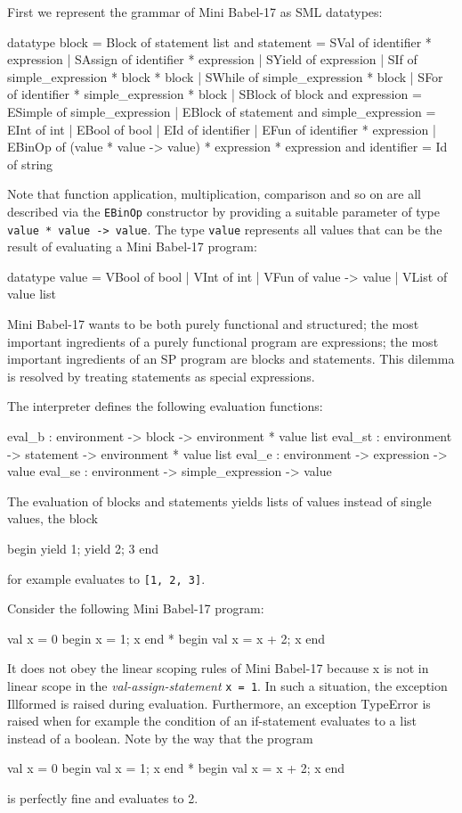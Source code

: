 \documentclass{llncs}
\newcommand{\bsrc}[1] {\lstinline!#1!}
\begin{document}
First we represent the grammar of Mini Babel-17 as SML datatypes:
\begin{babellisting}
datatype block = Block of statement list
and statement = 
       SVal of identifier * expression
     | SAssign of identifier * expression
     | SYield of expression
     | SIf of simple_expression * block * block
     | SWhile of simple_expression * block
     | SFor of identifier * simple_expression * block
     | SBlock of block
and expression =
       ESimple of simple_expression
     | EBlock of statement
and simple_expression =
       EInt of int  | EBool of bool | EId of identifier
     | EFun of identifier * expression
     | EBinOp of (value * value -> value) * 
                  expression * expression
and identifier = Id of string
\end{babellisting}
Note that function application, multiplication, comparison and so on are all described via the \bsrc{EBinOp} constructor by providing a suitable parameter of type \bsrc{value * value -> value}. The type \bsrc{value} represents all values that can be the result of evaluating a Mini Babel-17 program:
\begin{babellisting}
datatype value = VBool of bool | VInt of int
               | VFun of value -> value 
               | VList of value list
\end{babellisting}

Mini Babel-17 wants to be both purely functional and structured; the most important ingredients of a purely functional program are expressions; the most important ingredients of an SP program are blocks and statements. This dilemma is resolved by treating statements as special expressions.

The interpreter defines the following evaluation functions:
\begin{babellisting}
eval_b : environment -> block -> environment * value list
eval_st : environment -> statement -> environment * value list
eval_e : environment -> expression -> value
eval_se : environment -> simple_expression -> value
\end{babellisting}
The evaluation of blocks and statements yields lists of values instead of single values, the block
\begin{babellisting}
begin yield 1; yield 2; 3 end
\end{babellisting}
for example evaluates to \bsrc{[1, 2, 3]}.

Consider the following Mini Babel-17 program:
\begin{babellisting}
val x = 0
begin x = 1; x end * begin val x = x + 2; x end
\end{babellisting}
It does not obey the linear scoping rules of Mini Babel-17 because x is not in linear scope in the \emph{val-assign-statement} \bsrc{x = 1}.
In such a situation, the exception Illformed is raised during evaluation. Furthermore, an exception TypeError is raised when for example the condition of an if-statement evaluates to a list instead of a boolean. Note by the way that the program
\begin{babellisting}
val x = 0
begin val x = 1; x end * begin val x = x + 2; x end
\end{babellisting}
is perfectly fine and evaluates to 2.
\end{document}
